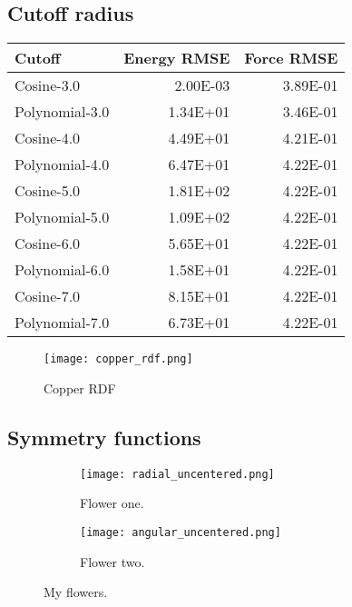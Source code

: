 \subsection{Cutoff radius}

\begin{tabular}{lrr}
\toprule
         Cutoff &  Energy RMSE &  Force RMSE \\
\midrule
     Cosine-3.0 &     2.00E-03 &    3.89E-01 \\
 Polynomial-3.0 &     1.34E+01 &    3.46E-01 \\
     Cosine-4.0 &     4.49E+01 &    4.21E-01 \\
 Polynomial-4.0 &     6.47E+01 &    4.22E-01 \\
     Cosine-5.0 &     1.81E+02 &    4.22E-01 \\
 Polynomial-5.0 &     1.09E+02 &    4.22E-01 \\
     Cosine-6.0 &     5.65E+01 &    4.22E-01 \\
 Polynomial-6.0 &     1.58E+01 &    4.22E-01 \\
     Cosine-7.0 &     8.15E+01 &    4.22E-01 \\
 Polynomial-7.0 &     6.73E+01 &    4.22E-01 \\
\bottomrule
\end{tabular}

\begin{figure}
    \centering
    \texttt{[image: copper\_rdf.png]}
    \caption{Copper RDF}
    \label{fig:copper_rdf}
\end{figure}

\subsection{Symmetry functions}

\begin{figure}[!tbp]
\begin{adjustbox}{max width=1.2\linewidth,center}
\centering
  \begin{subfigure}[b]{0.55\textwidth}
      \texttt{[image: radial\_uncentered.png]}
    \caption{Flower one.}
    \label{fig:f1}
  \end{subfigure}
  \hfill
  \begin{subfigure}[b]{0.55\textwidth}
      \texttt{[image: angular\_uncentered.png]}
    \caption{Flower two.}
    \label{fig:f2}
  \end{subfigure}
\end{adjustbox}
\caption{My flowers.}
\end{figure}

